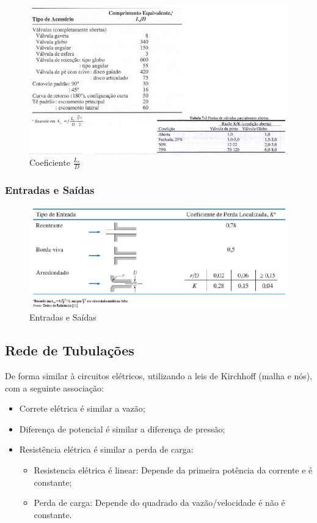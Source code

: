 \documentclass[a4paper, 12pt]{article}
\begin{document}
	\newpage
	\begin{figure}[h]
		\centering
		\includegraphics[width=0.9\linewidth]{imagens/valv2}
		\caption{Coeficiente $\frac{L_{e}}{D}$}
		\label{fig:valv2}
	\end{figure}
	
	\newpage
\subsubsection{Entradas e Saídas}
	\begin{figure}[h]
		\centering
		\includegraphics[width=0.9\linewidth]{imagens/valv3}
		\caption{Entradas e Saídas}
		\label{fig:valv3}
	\end{figure}
	
\subsection{Rede de Tubulações}
	De forma similar à circuitos elétricos, utilizando a leis de Kirchhoff (malha e nós), com a seguinte associação:
		\begin{itemize}
			\item Correte elétrica é similar a vazão;
			\item Diferença de potencial é similar a diferença de pressão;
			\item Resistência elétrica é similar a perda de carga:
				\begin{itemize}
					\item Resistencia elétrica é linear:
					Depende da primeira potência da corrente e é constante;
					\item Perda de carga:
					Depende do quadrado da vazão/velocidade é não é constante.
				\end{itemize}
		\end{itemize}
	
\end{document}
